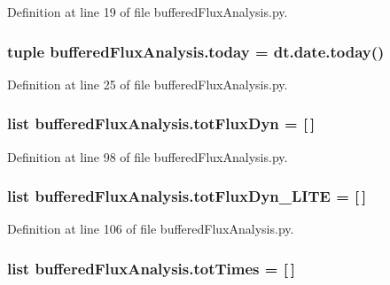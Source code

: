 Definition at line 19 of file buffered\-Flux\-Analysis.\-py.

\hypertarget{namespacebuffered_flux_analysis_a37cf8287ac5d9f5b83732efe352cf154}{
\subsubsection[{today}]{\setlength{\rightskip}{0pt plus 5cm}tuple buffered\-Flux\-Analysis.\-today = dt.\-date.\-today()}}\label{namespacebuffered_flux_analysis_a37cf8287ac5d9f5b83732efe352cf154}


Definition at line 25 of file buffered\-Flux\-Analysis.\-py.

\hypertarget{namespacebuffered_flux_analysis_a8f99b100d2f8191100ee93d633cb7a62}{
\subsubsection[{tot\-Flux\-Dyn}]{\setlength{\rightskip}{0pt plus 5cm}list buffered\-Flux\-Analysis.\-tot\-Flux\-Dyn = \mbox{[}$\,$\mbox{]}}}\label{namespacebuffered_flux_analysis_a8f99b100d2f8191100ee93d633cb7a62}


Definition at line 98 of file buffered\-Flux\-Analysis.\-py.

\hypertarget{namespacebuffered_flux_analysis_afc46fc569c50ea77d9dd0a6a1e9eb438}{
\subsubsection[{tot\-Flux\-Dyn\-\_\-\-L\-I\-T\-E}]{\setlength{\rightskip}{0pt plus 5cm}list buffered\-Flux\-Analysis.\-tot\-Flux\-Dyn\-\_\-\-L\-I\-T\-E = \mbox{[}$\,$\mbox{]}}}\label{namespacebuffered_flux_analysis_afc46fc569c50ea77d9dd0a6a1e9eb438}


Definition at line 106 of file buffered\-Flux\-Analysis.\-py.

\hypertarget{namespacebuffered_flux_analysis_a11c5182cf16d185b8ebd807aff4eb839}{
\subsubsection[{tot\-Times}]{\setlength{\rightskip}{0pt plus 5cm}list buffered\-Flux\-Analysis.\-tot\-Times = \mbox{[}$\,$\mbox{]}}}\label{namespacebuffered_flux_analysis_a11c5182cf16d185b8ebd807aff4eb839}


